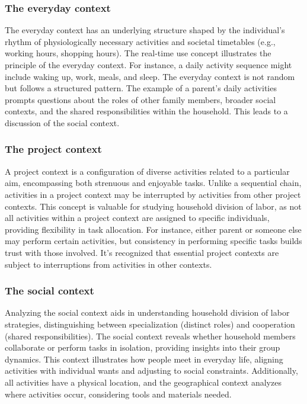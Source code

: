 \documentclass{chart}
\begin{document}
\subsubsection{ The everyday context}
The everyday context has an underlying structure shaped by the individual's rhythm of physiologically necessary activities and societal timetables (e.g., working hours, shopping hours). The real-time use concept illustrates the principle of the everyday context. For instance, a daily activity sequence might include waking up, work, meals, and sleep. The everyday context is not random but follows a structured pattern. The example of a parent's daily activities prompts questions about the roles of other family members, broader social contexts, and the shared responsibilities within the household. This leads to a discussion of the social context.
\subsubsection{ The project context}
A project context is a configuration of diverse activities related to a particular aim, encompassing both strenuous and enjoyable tasks. Unlike a sequential chain, activities in a project context may be interrupted by activities from other project contexts. This concept is valuable for studying household division of labor, as not all activities within a project context are assigned to specific individuals, providing flexibility in task allocation. For instance, either parent or someone else may perform certain activities, but consistency in performing specific tasks builds trust with those involved. It's recognized that essential project contexts are subject to interruptions from activities in other contexts.
\subsubsection{ The social context}
Analyzing the social context aids in understanding household division of labor strategies, distinguishing between specialization (distinct roles) and cooperation (shared responsibilities). The social context reveals whether household members collaborate or perform tasks in isolation, providing insights into their group dynamics. This context illustrates how people meet in everyday life, aligning activities with individual wants and adjusting to social constraints. Additionally, all activities have a physical location, and the geographical context analyzes where activities occur, considering tools and materials needed.
\end{document}
